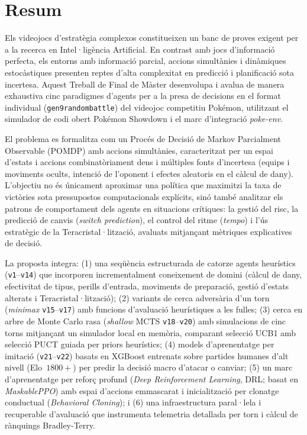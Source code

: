 \chapter*{Resum}
Els videojocs d'estratègia complexos constitueixen un banc de proves exigent per a la recerca en Intel·ligència Artificial. En contrast amb jocs d'informació perfecta, els entorns amb informació parcial, accions simultànies i dinàmiques estocàstiques presenten reptes d'alta complexitat en predicció i planificació sota incertesa. Aquest Treball de Final de Màster desenvolupa i avalua de manera exhaustiva cinc paradigmes d'agents per a la presa de decisions en el format individual (\texttt{gen9randombattle}) del videojoc competitiu Pokémon, utilitzant el simulador de codi obert Pokémon Showdown i el marc d'integració \textit{poke-env}.

El problema es formalitza com un Procés de Decisió de Markov Parcialment Observable (POMDP) amb accions simultànies, caracteritzat per un espai d'estats i accions combinatòriament dens i múltiples fonts d'incertesa (equips i moviments ocults, intenció de l'oponent i efectes aleatoris en el càlcul de dany). L'objectiu no és únicament aproximar una política que maximitzi la taxa de victòries sota pressupostos computacionals explícits, sinó també analitzar els patrons de comportament dels agents en situacions crítiques: la gestió del risc, la predicció de canvis (\emph{switch prediction}), el control del ritme (\emph{tempo}) i l'ús estratègic de la Teracristal·lització, avaluats mitjançant mètriques explicatives de decisió.

La proposta integra: (1) una seqüència estructurada de catorze agents heurístics (\texttt{v1}--\texttt{v14}) que incorporen incrementalment coneixement de domini (càlcul de dany, efectivitat de tipus, perills d'entrada, moviments de preparació, gestió d'estats alterats i Teracristal·lització); (2) variants de cerca adversària d'un torn (\emph{minimax} \texttt{v15}--\texttt{v17}) amb funcions d'avaluació heurístiques a les fulles; (3) cerca en arbre de Monte Carlo rasa (\emph{shallow} MCTS \texttt{v18}--\texttt{v20}) amb simulacions de cinc torns mitjançant un simulador local en memòria, comparant selecció UCB1 amb selecció PUCT guiada per priors heurístics; (4) models d'aprenentatge per imitació (\texttt{v21}--\texttt{v22}) basats en XGBoost entrenats sobre partides humanes d'alt nivell (Elo~$1800+$) per predir la decisió macro d'atacar o canviar; (5) un marc d'aprenentatge per reforç profund (\emph{Deep Reinforcement Learning}, DRL; basat en \emph{MaskablePPO}) amb espai d'accions emmascarat i inicialització per clonatge conductual (\emph{Behavioral Cloning}); i (6) una infraestructura paral·lela i recuperable d'avaluació que instrumenta telemetria detallada per torn i càlcul de rànquings Bradley-Terry.

